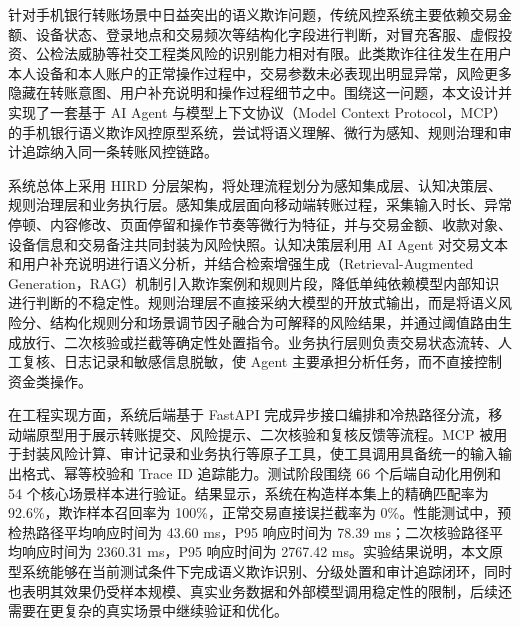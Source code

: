 针对手机银行转账场景中日益突出的语义欺诈问题，传统风控系统主要依赖交易金额、设备状态、登录地点和交易频次等结构化字段进行判断，对冒充客服、虚假投资、公检法威胁等社交工程类风险的识别能力相对有限。此类欺诈往往发生在用户本人设备和本人账户的正常操作过程中，交易参数未必表现出明显异常，风险更多隐藏在转账意图、用户补充说明和操作过程细节之中。围绕这一问题，本文设计并实现了一套基于 AI Agent 与模型上下文协议（Model Context Protocol，MCP）的手机银行语义欺诈风控原型系统，尝试将语义理解、微行为感知、规则治理和审计追踪纳入同一条转账风控链路。

系统总体上采用 HIRD 分层架构，将处理流程划分为感知集成层、认知决策层、规则治理层和业务执行层。感知集成层面向移动端转账过程，采集输入时长、异常停顿、内容修改、页面停留和操作节奏等微行为特征，并与交易金额、收款对象、设备信息和交易备注共同封装为风险快照。认知决策层利用 AI Agent 对交易文本和用户补充说明进行语义分析，并结合检索增强生成（Retrieval-Augmented Generation，RAG）机制引入欺诈案例和规则片段，降低单纯依赖模型内部知识进行判断的不稳定性。规则治理层不直接采纳大模型的开放式输出，而是将语义风险分、结构化规则分和场景调节因子融合为可解释的风险结果，并通过阈值路由生成放行、二次核验或拦截等确定性处置指令。业务执行层则负责交易状态流转、人工复核、日志记录和敏感信息脱敏，使 Agent 主要承担分析任务，而不直接控制资金类操作。

在工程实现方面，系统后端基于 FastAPI 完成异步接口编排和冷热路径分流，移动端原型用于展示转账提交、风险提示、二次核验和复核反馈等流程。MCP 被用于封装风险计算、审计记录和业务执行等原子工具，使工具调用具备统一的输入输出格式、幂等校验和 Trace ID 追踪能力。测试阶段围绕 66 个后端自动化用例和 54 个核心场景样本进行验证。结果显示，系统在构造样本集上的精确匹配率为 92.6\%，欺诈样本召回率为 100\%，正常交易直接误拦截率为 0\%。性能测试中，预检热路径平均响应时间为 43.60 ms，P95 响应时间为 78.39 ms；二次核验路径平均响应时间为 2360.31 ms，P95 响应时间为 2767.42 ms。实验结果说明，本文原型系统能够在当前测试条件下完成语义欺诈识别、分级处置和审计追踪闭环，同时也表明其效果仍受样本规模、真实业务数据和外部模型调用稳定性的限制，后续还需要在更复杂的真实场景中继续验证和优化。
